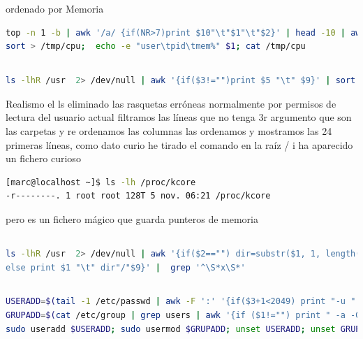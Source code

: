 \documentclass[preprint,11pt]{elsarticle}
\begin{document}
ordenado por Memoria

\begin{lstlisting}[language=bash,  basicstyle=\tiny,]
top -n 1 -b | awk '/a/ {if(NR>7)print $10"\t"$1"\t"$2}' | head -10 | awk '{print $3"\t"$2"\t"$1}' |
sort > /tmp/cpu;  echo -e "user\tpid\tmem%" $1; cat /tmp/cpu

\end{lstlisting}

\subsection{}
\begin{lstlisting}[language=bash,  basicstyle=\tiny,]
ls -lhR /usr  2> /dev/null | awk '{if($3!="")print $5 "\t" $9}' | sort -rh | head -24

\end{lstlisting}

Realismo el ls eliminado las rasquetas erróneas normalmente por permisos de lectura del usuario actual filtramos las líneas que no tenga 3r argumento que son las carpetas y re ordenamos las columnas las ordenamos y mostramos las 24 primeras líneas, como dato curio he tirado el comando en la raíz / i ha aparecido un fichero curioso 
\begin{lstlisting}[language=bash,  basicstyle=\tiny,]
[marc@localhost ~]$ ls -lh /proc/kcore
-r--------. 1 root root 128T 5 nov. 06:21 /proc/kcore

\end{lstlisting}
pero es un fichero mágico que guarda punteros de memoria

\subsection{}
\begin{lstlisting}[language=bash,  basicstyle=\tiny,]
ls -lhR /usr  2> /dev/null | awk '{if($2=="") dir=substr($1, 1, length($1)-1);
else print $1 "\t" dir"/"$9}' |  grep '^\S*x\S*'

\end{lstlisting}

\subsection{}
\begin{lstlisting}[language=bash,  basicstyle=\tiny,]
USERADD=$(tail -1 /etc/passwd | awk -F ':' '{if($3+1<2049) print "-u " $3+1 " marc2"; else print "uid > 2048" }');
GRUPADD=$(cat /etc/group | grep users | awk '{if ($1!="") print " -a -G users marc2"; else sudo groupadd users}');
sudo useradd $USERADD; sudo usermod $GRUPADD; unset USERADD; unset GRUPADD 

\end{lstlisting}
\end{document}
